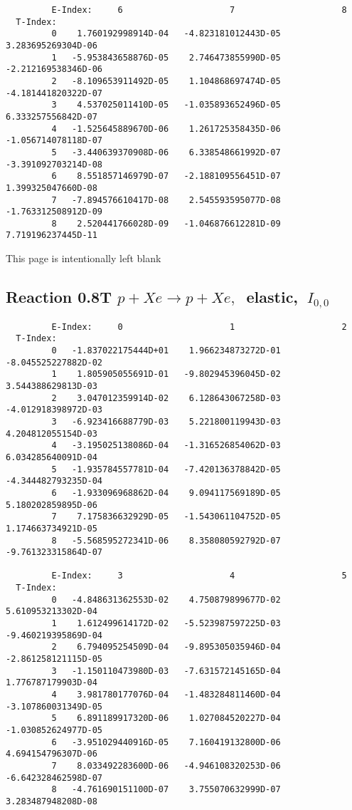 \documentclass[12pt,dvipdfmx]{article}
\begin{document}
{\begin{small}
\begin{verbatim}
         E-Index:     6                     7                     8
  T-Index:
         0    1.760192998914D-04   -4.823181012443D-05    3.283695269304D-06
         1   -5.953843658876D-05    2.746473855990D-05   -2.212169538346D-06
         2   -8.109653911492D-05    1.104868697474D-05   -4.181441820322D-07
         3    4.537025011410D-05   -1.035893652496D-05    6.333257556842D-07
         4   -1.525645889670D-06    1.261725358435D-06   -1.056714078118D-07
         5   -3.440639370908D-06    6.338548661992D-07   -3.391092703214D-08
         6    8.551857146979D-07   -2.188109556451D-07    1.399325047660D-08
         7   -7.894576610417D-08    2.545593595077D-08   -1.763312508912D-09
         8    2.520441766028D-09   -1.046876612281D-09    7.719196237445D-11

\end{verbatim}\end{small}
\newpage
This page is intentionally left blank
\newpage


\subsection{
Reaction 0.8T  $p + Xe \rightarrow p + Xe ,\ $
 elastic, $\  I_{0,0}$
}

\begin{small}\begin{verbatim}
         E-Index:     0                     1                     2
  T-Index:
         0   -1.837022175444D+01    1.966234873272D-01   -8.045525227882D-02
         1    1.805905055691D-01   -9.802945396045D-02    3.544388629813D-03
         2    3.047012359914D-02    6.128643067258D-03   -4.012918398972D-03
         3   -6.923416688779D-03    5.221800119943D-03    4.204812055154D-03
         4   -3.195025138086D-04   -1.316526854062D-03    6.034285640091D-04
         5   -1.935784557781D-04   -7.420136378842D-05   -4.344482793235D-04
         6   -1.933096968862D-04    9.094117569189D-05    5.180202859895D-06
         7    7.175836632929D-05   -1.543061104752D-05    1.174663734921D-05
         8   -5.568595272341D-06    8.358080592792D-07   -9.761323315864D-07

         E-Index:     3                     4                     5
  T-Index:
         0   -4.848631362553D-02    4.750879899677D-02    5.610953213302D-04
         1    1.612499614172D-02   -5.523987597225D-03   -9.460219395869D-04
         2    6.794095254509D-04   -9.895305035946D-04   -2.861258121115D-05
         3   -1.150110473980D-03   -7.631572145165D-04    1.776787179903D-04
         4    3.981780177076D-04   -1.483284811460D-04   -3.107860031349D-05
         5    6.891189917320D-06    1.027084520227D-04   -1.030852624977D-05
         6   -3.951029440916D-05    7.160419132800D-06    4.694154796307D-06
         7    8.033492283600D-06   -4.946108320253D-06   -6.642328462598D-07
         8   -4.761690151100D-07    3.755070632999D-07    3.283487948208D-08


\end{verbatim}
\end{small}}
\end{document}
